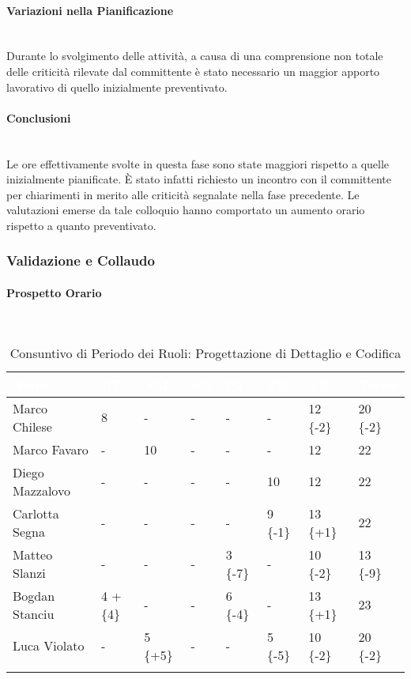 \paragraph{Variazioni nella Pianificazione} ~\\ 
Durante lo svolgimento delle attività, a causa di una comprensione non totale delle criticità rilevate dal committente è stato necessario un maggior apporto lavorativo di quello inizialmente preventivato.

\paragraph{Conclusioni} ~\\ Le ore effettivamente svolte in questa fase sono state maggiori rispetto a quelle inizialmente pianificate. È stato infatti richiesto un incontro con il committente per chiarimenti in merito alle criticità segnalate nella fase precedente. Le valutazioni emerse da tale colloquio hanno comportato un aumento orario rispetto a quanto preventivato.

\pagebreak


\subsubsection{Validazione e Collaudo}
\label{PRC}
\paragraph{Prospetto Orario } ~\\
\begin{longtable}{|C{.30\textwidth}|C{.06\textwidth}|C{.06\textwidth}|C{.06\textwidth} | C{.06\textwidth}| C{.06\textwidth} | C{.06\textwidth} | C{.10\textwidth} |}
	\hline
		\textbf{\textcolor{white}{Nome}} & \textbf{\textcolor{white}{RE}} & \textbf{\textcolor{white}{AM}} & \textbf{\textcolor{white}{AN}} & \textbf{\textcolor{white}{PJ}} & \textbf{\textcolor{white}{PR}} & \textbf{\textcolor{white}{VE}} & \textbf{\textcolor{white}{Totale}}\\
	\hline 
	Marco Chilese & 8 & - & - & - & - & 12 \{-2\}& 20 \{-2\} \\
	\hline
	Marco Favaro &  - & 10 & - & - & - & 12 & 22 \\
	\hline
	Diego Mazzalovo & - & -  & - & - & 10 & 12 & 22 \\
	\hline
	Carlotta Segna & - & -  & - & - & 9 \{-1\} & 13 \{+1\} & 22 \\
	\hline
	Matteo Slanzi & - & - & - & 3 \{-7\}  & - & 10 \{-2\} & 13 \{-9\}\\
	\hline
	Bogdan Stanciu & 4 +\{4\} & - & - & 6 \{-4\} &  - & 13 \{+1\} & 23 \\
	\hline
	Luca Violato & - & 5 \{+5\} & - & - & 5 \{-5\} & 10 \{-2\}  & 20 \{-2\}\\   
	\hline
	
	
	\caption{Consuntivo di Periodo dei Ruoli: Progettazione di Dettaglio e Codifica}
	\label{CP PRC}
\end{longtable}

